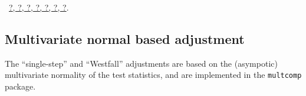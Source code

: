 \documentclass[reqno]{amsart}
\renewcommand{\NWlink}[2]{\hyperlink{#1}{#2}}
\begin{document}
\begin{flushleft}
\begin{list}{}{}
\mbox{}\verb@  }@\\
\mbox{}\verb@  @\\
\mbox{}\verb@  out <- adjusted[base]@\\
\mbox{}\verb@  names(out) <- hypotheses@\\
\mbox{}\verb@  return(out)@\\
\mbox{}\verb@}@\\
\mbox{}\verb@@{\NWsep}
\end{list}
\vspace{-1.5ex}
\footnotesize
\begin{list}{}{\setlength{\itemsep}{-\parsep}\setlength{\itemindent}{-\leftmargin}}
\item \NWtxtFileDefBy\ \NWlink{nuweb?}{?}\NWlink{nuweb?}{, ?}\NWlink{nuweb?}{, ?}\NWlink{nuweb?}{, ?}\NWlink{nuweb?}{, ?}\NWlink{nuweb?}{, ?}\NWlink{nuweb?}{, ?}.

\item{}
\end{list}
\vspace{4ex}
\end{flushleft}
\subsection{Multivariate normal based adjustment}
The ``single-step'' and ``Westfall'' adjustments are based on the (asympotic) multivariate normality of the test statistics, and
are implemented in the \texttt{multcomp} package.
\end{document}
